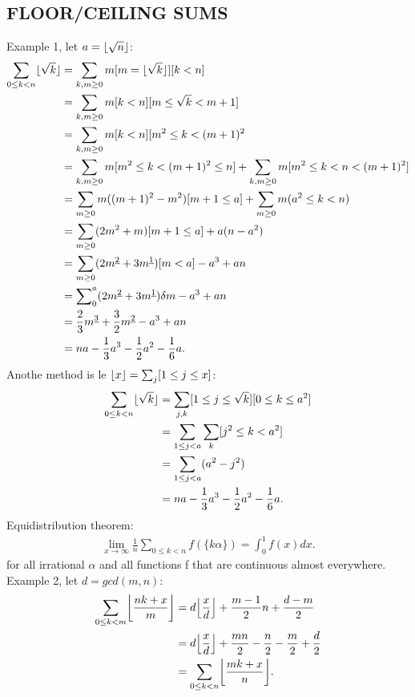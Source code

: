\documentclass{article}
\DeclarePairedDelimiter\floor{\lfloor}{\rfloor}
\begin{document}
\subsection{FLOOR/CEILING SUMS}
Example 1, let $a = \floor{\sqrt{n}}$:
\begin{align}
\sum_{0 \le k < n} \floor{\sqrt{k}} &= \sum_{k,m \ge 0} m[m = \floor{\sqrt{k}}][k < n] \\
				    &= \sum_{k,m \ge 0} m[k<n][m \le \sqrt{k} < m+1] \\
				    &= \sum_{k,m \ge 0} m[k<n][m^2 \le k < (m+1)^2 \\
				    &= \sum_{k,m \ge 0} m[m^2 \le k < (m+1)^2 \le n]  + \sum_{k,m \ge 0} m[m^2 \le k < n < (m+1)^2] \\
				    &= \sum_{m \ge 0} m ((m+1)^2 - m^2)[m+1 \le a] + \sum_{m \ge 0} m(a^2 \le k < n) \\
				    &= \sum_{m \ge 0} (2m^2 + m )[m+1 \le a] + a(n - a^2) \\
				    &= \sum_{m \ge 0}  (2m^{\underline{2}} + 3m^{\underline{1}}) [m < a] - a^3 + an \\
				    &= \sum\nolimits_0^a (2m^{\underline{2}} + 3m^{\underline{1}})\delta m - a^3 + an \\
				    &= \frac{2}{3}m^{\underline{3}} + \frac{3}{2}m^{\underline{2}} - a^3 + an \\
				    &= na - \frac{1}{3}a^3 - \frac{1}{2}a^2 - \frac{1}{6}a.
\end{align}
Anothe method is le $\floor{x} = \sum_j [1 \le j \le x]$:
\begin{align}
\sum_{0 \le k < n} \floor{\sqrt{k}} &= \sum_{j,k} [1 \le j \le \sqrt{k}][0 \le k \le a^2] \\
				    &= \sum_{1 \le j < a} \sum_k [j^2 \le k < a^2] \\
				    &= \sum_{1 \le j < a} (a^2 - j^2) \\
				    &= na - \frac{1}{3}a^3 - \frac{1}{2}a^2 - \frac{1}{6}a.
\end{align}
Equidistribution theorem:
\begin{align}
\lim_{x\to\infty} \frac{1}{n}\sum_{0 \le k < n} f(\{k\alpha\}) = \int_{0}^{1} f(x) dx.
\end{align}
for all irrational $\alpha$ and all functions f that are continuous almost everywhere.\\
Example 2, let $d = gcd(m,n)$:
\begin{align}
\sum_{0 \le k < m} \floor*{\frac{nk + x}{m}} &= d\floor*{\frac{x}{d}} + \frac{m-1}{2}n + \frac{d-m}{2} \\
					     &= d\floor*{\frac{x}{d}} + \frac{mn}{2} - \frac{n}{2} - \frac{m}{2} + \frac{d}{2} \\
					     &= \sum_{0 \le k < n} \floor*{\frac{mk + x}{n}}.
\end{align}
\end{document}
